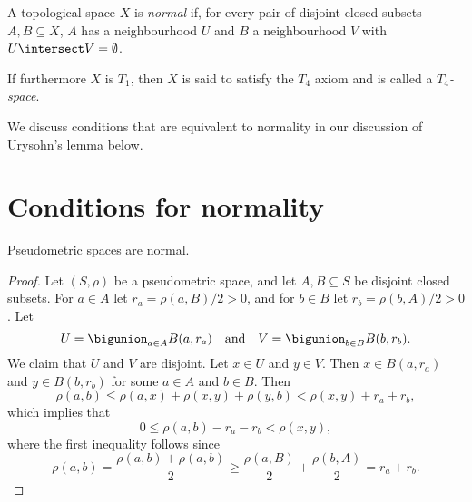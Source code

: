 \documentclass[article, a4paper, 11pt, oneside]{memoir}
\numberwithin{equation}{chapter}
\begin{document}
\begin{definition}
    A topological space $X$ is \emph{normal} if, for every pair of disjoint closed subsets $A,B \subseteq X$, $A$ has a neighbourhood $U$ and $B$ a neighbourhood $V$ with $U \intersect V = \emptyset$.

    If furthermore $X$ is $T_1$, then $X$ is said to satisfy the $T_4$ axiom and is called a \emph{$T_4$-space}.
\end{definition}

We discuss conditions that are equivalent to normality in our discussion of Urysohn's lemma below.


\section{Conditions for normality}

\begin{proposition}
    \label{thm:metric-space-normal}
    Pseudometric spaces are normal.
\end{proposition}

\begin{proof}
    Let $(S,\rho)$ be a pseudometric space, and let $A, B \subseteq S$ be disjoint closed subsets. For $a \in A$ let $r_a = \rho(a,B)/2 > 0$, and for $b \in B$ let $r_b = \rho(b,A)/2 > 0$. Let
    \begin{equation*}
        U = \bigunion_{a \in A} B(a,r_a)
        \quad \text{and} \quad
        V = \bigunion_{b \in B} B(b,r_b).
    \end{equation*}
    We claim that $U$ and $V$ are disjoint. Let $x \in U$ and $y \in V$. Then $x \in B(a,r_a)$ and $y \in B(b,r_b)$ for some $a \in A$ and $b \in B$. Then
    \begin{equation*}
        \rho(a,b)
            \leq \rho(a,x) + \rho(x,y) + \rho(y,b)
            < \rho(x,y) + r_a + r_b,
    \end{equation*}
    which implies that
    \begin{equation*}
        0
            \leq \rho(a,b) - r_a - r_b
            < \rho(x,y),
    \end{equation*}
    where the first inequality follows since
    \begin{equation*}
        \rho(a,b)
            = \frac{\rho(a,b) + \rho(a,b)}{2}
            \geq \frac{\rho(a,B)}{2} + \frac{\rho(b,A)}{2}
            = r_a + r_b.
    \end{equation*}
\end{proof}
\end{document}
